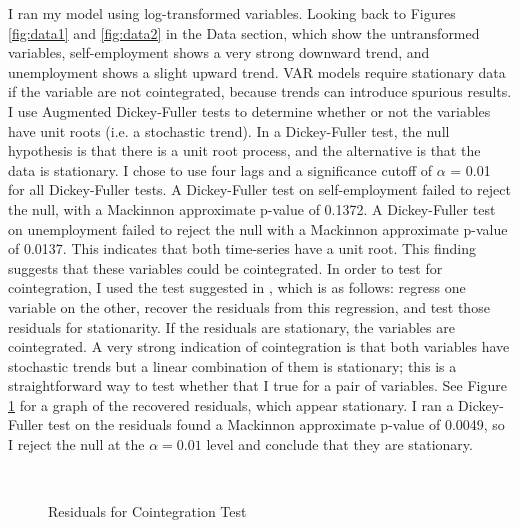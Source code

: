 \documentclass[]{ecca}
\begin{document}
I ran my model using log-transformed variables. Looking back to Figures \ref{fig:data1} and \ref{fig:data2} in the Data section, which show the untransformed variables, self-employment shows a very strong downward trend, and unemployment shows a slight upward trend. VAR models require stationary data if the variable are not cointegrated, because trends can introduce spurious results. I use Augmented Dickey-Fuller tests to determine whether or not the variables have unit roots (i.e. a stochastic trend). In a Dickey-Fuller test, the null hypothesis is that there is a unit root process, and the alternative is that the data is stationary. I chose to use four lags and a significance cutoff of $\alpha$ = 0.01 for all Dickey-Fuller tests. A Dickey-Fuller test on self-employment failed to reject the null, with a Mackinnon approximate p-value of 0.1372. A Dickey-Fuller test on unemployment failed to reject the null with a Mackinnon approximate p-value of 0.0137. This indicates that both time-series have a unit root. This finding suggests that these variables could be cointegrated. In order to test for cointegration, I used the test suggested in \cite{engle87}, which is as follows: regress one variable on the other, recover the residuals from this regression, and test those residuals for stationarity. If the residuals are stationary, the variables are cointegrated. A very strong indication of cointegration is that both variables have stochastic trends but a linear combination of them is stationary; this is a straightforward way to test whether that I true for a pair of variables. See Figure \ref{fig:Resid} for a graph of the recovered residuals, which appear stationary. I ran a Dickey-Fuller test on the residuals found a Mackinnon approximate p-value of 0.0049, so I reject the null at the $\alpha=0.01$ level and conclude that they are stationary.

\begin{figure}[!h]
	\centering
	\medskip\\
	\caption{Residuals for Cointegration Test}
	\label{fig:Resid}
\end{figure}
\end{document}
